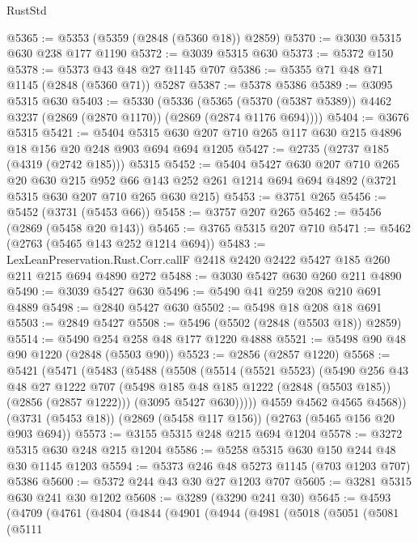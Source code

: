 \begin{lexlean}{RustStd}
\begin{coremodule}
{\begin{coremodule}
{{{{{{{{{{{{@5365 := @5353 (@5359 (@2848 (@5360 @18)) @2859)
@5370 := @3030 @5315 @630 @238 @177 @1190
@5372 := @3039 @5315 @630
@5373 := @5372 @150
@5378 := @5373 @43 @48 @27 @1145 @707
@5386 := @5355 @71 @48 @71 @1145 (@2848 (@5360 @71)) @5287
@5387 := @5378 @5386
@5389 := @3095 @5315 @630
@5403 := @5330
    (@5336
      (@5365 (@5370 (@5387 @5389)) @4462 @3237 (@2869 (@2870 @1170)) (@2869 (@2874 @1176 @694))))
@5404 := @3676 @5315
@5421 := @5404 @5315 @630 @207 @710 @265 @117 @630 @215 @4896 @18 @156 @20 @248 @903 @694 @694 @1205
@5427 := @2735 (@2737 @185 (@4319 (@2742 @185))) @5315
@5452 := @5404
    @5427
    @630
    @207
    @710
    @265
    @20
    @630
    @215
    @952
    @66
    @143
    @252
    @261
    @1214
    @694
    @694
    @4892
    (@3721 @5315 @630 @207 @710 @265 @630 @215)
@5453 := @3751 @265
@5456 := @5452 (@3731 (@5453 @66))
@5458 := @3757 @207 @265
@5462 := @5456 (@2869 (@5458 @20 @143))
@5465 := @3765 @5315 @207 @710
@5471 := @5462 (@2763 (@5465 @143 @252 @1214 @694))
@5483 := LexLeanPreservation.Rust.Corr.callF
    @2418
    @2420
    @2422
    @5427
    @185
    @260
    @211
    @215
    @694
    @4890
    @272
@5488 := @3030 @5427 @630 @260 @211 @4890
@5490 := @3039 @5427 @630
@5496 := @5490 @41 @259 @208 @210 @691 @4889
@5498 := @2840 @5427 @630
@5502 := @5498 @18 @208 @18 @691
@5503 := @2849 @5427
@5508 := @5496 (@5502 (@2848 (@5503 @18)) @2859)
@5514 := @5490 @254 @258 @48 @177 @1220 @4888
@5521 := @5498 @90 @48 @90 @1220 (@2848 (@5503 @90))
@5523 := @2856 (@2857 @1220)
@5568 := @5421
    (@5471
      (@5483
        (@5488
          (@5508
            (@5514
              (@5521 @5523)
              (@5490
                @256
                @43
                @48
                @27
                @1222
                @707
                (@5498 @185 @48 @185 @1222 (@2848 (@5503 @185)) (@2856 (@2857 @1222)))
                (@3095 @5427 @630)))))
        @4559
        @4562
        @4565
        @4568))
    (@3731 (@5453 @18))
    (@2869 (@5458 @117 @156))
    (@2763 (@5465 @156 @20 @903 @694))
@5573 := @3155 @5315 @248 @215 @694 @1204
@5578 := @3272 @5315 @630 @248 @215 @1204
@5586 := @5258 @5315 @630 @150 @244 @48 @30 @1145 @1203
@5594 := @5373 @246 @48 @5273 @1145 (@703 @1203 @707) @5386
@5600 := @5372 @244 @43 @30 @27 @1203 @707
@5605 := @3281 @5315 @630 @241 @30 @1202
@5608 := @3289 (@3290 @241 @30)
@5645 := @4593
    (@4709
      (@4761
        (@4804
          (@4844
            (@4901
              (@4944
                (@4981
                  (@5018
                    (@5051
                      (@5081
                        (@5111
}}}}}}}}}}}}
\end{coremodule}}
\end{coremodule}
\end{lexlean}
